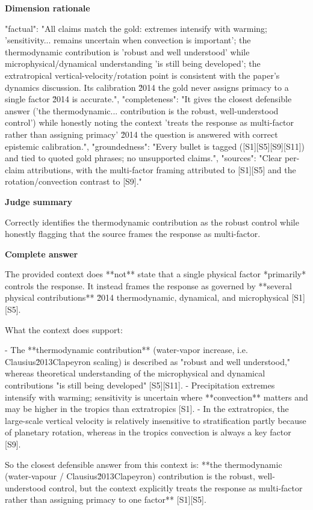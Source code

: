 \documentclass[10pt]{article}
\begin{document}
\textbf{Dimension rationale}
\begin{EvidenceText}
{
  "factual": "All claims match the gold: extremes intensify with warming; 'sensitivity... remains uncertain when convection is important'; the thermodynamic contribution is 'robust and well understood' while microphysical/dynamical understanding 'is still being developed'; the extratropical vertical-velocity/rotation point is consistent with the paper's dynamics discussion. Its calibration \u2014 the gold never assigns primacy to a single factor \u2014 is accurate.",
  "completeness": "It gives the closest defensible answer ('the thermodynamic... contribution is the robust, well-understood control') while honestly noting the context 'treats the response as multi-factor rather than assigning primacy' \u2014 the question is answered with correct epistemic calibration.",
  "groundedness": "Every bullet is tagged ([S1][S5][S9][S11]) and tied to quoted gold phrases; no unsupported claims.",
  "sources": "Clear per-claim attributions, with the multi-factor framing attributed to [S1][S5] and the rotation/convection contrast to [S9]."
}
\end{EvidenceText}

\textbf{Judge summary}
\begin{EvidenceText}
Correctly identifies the thermodynamic contribution as the robust control while honestly flagging that the source frames the response as multi-factor.
\end{EvidenceText}

\textbf{Complete answer}
\begin{AnswerText}
The provided context does **not** state that a single physical factor *primarily* controls the response. It instead frames the response as governed by **several physical contributions** \u2014 thermodynamic, dynamical, and microphysical [S1][S5].

What the context does support:

- The **thermodynamic contribution** (water-vapor increase, i.e. Clausius\u2013Clapeyron scaling) is described as "robust and well understood," whereas theoretical understanding of the microphysical and dynamical contributions "is still being developed" [S5][S11].
- Precipitation extremes intensify with warming; sensitivity is uncertain where **convection** matters and may be higher in the tropics than extratropics [S1].
- In the extratropics, the large-scale vertical velocity is relatively insensitive to stratification partly because of planetary rotation, whereas in the tropics convection is always a key factor [S9].

So the closest defensible answer from this context is: **the thermodynamic (water-vapour / Clausius\u2013Clapeyron) contribution is the robust, well-understood control, but the context explicitly treats the response as multi-factor rather than assigning primacy to one factor** [S1][S5].
\end{AnswerText}
\end{document}
